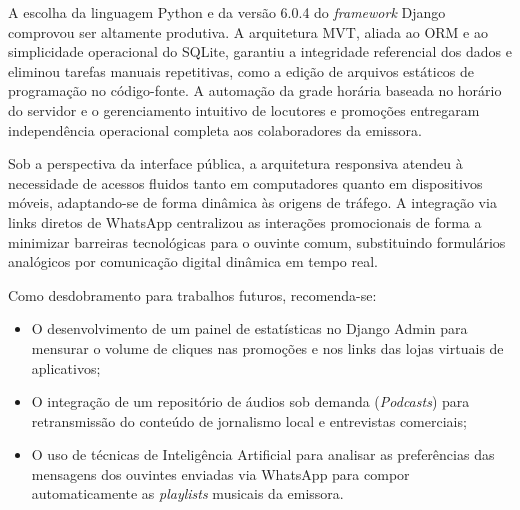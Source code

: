 \documentclass[12pt, openright, oneside, a4paper, brazil]{ads-unipac-abntex2}
\begin{document}
A escolha da linguagem Python e da versão 6.0.4 do \textit{framework} Django comprovou ser altamente produtiva. A arquitetura MVT, aliada ao ORM e ao simplicidade operacional do SQLite, garantiu a integridade referencial dos dados e eliminou tarefas manuais repetitivas, como a edição de arquivos estáticos de programação no código-fonte. A automação da grade horária baseada no horário do servidor e o gerenciamento intuitivo de locutores e promoções entregaram independência operacional completa aos colaboradores da emissora.

Sob a perspectiva da interface pública, a arquitetura responsiva atendeu à necessidade de acessos fluidos tanto em computadores quanto em dispositivos móveis, adaptando-se de forma dinâmica às origens de tráfego. A integração via links diretos de WhatsApp centralizou as interações promocionais de forma a minimizar barreiras tecnológicas para o ouvinte comum, substituindo formulários analógicos por comunicação digital dinâmica em tempo real.

Como desdobramento para trabalhos futuros, recomenda-se:
\begin{itemize}
    \item O desenvolvimento de um painel de estatísticas no Django Admin para mensurar o volume de cliques nas promoções e nos links das lojas virtuais de aplicativos;
    \item O integração de um repositório de áudios sob demanda (\textit{Podcasts}) para retransmissão do conteúdo de jornalismo local e entrevistas comerciais;
    \item O uso de técnicas de Inteligência Artificial para analisar as preferências das mensagens dos ouvintes enviadas via WhatsApp para compor automaticamente as \textit{playlists} musicais da emissora.
\end{itemize}

\postextual



\end{document}
